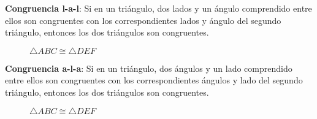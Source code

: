\begin{postulate}{\textbf{Congruencia l-a-l}:}
    Si en un triángulo, dos lados y un ángulo comprendido entre ellos son congruentes con los correspondientes lados y ángulo del segundo triángulo, entonces los dos triángulos son congruentes.

    \begin{figure}[h!]

        \centering

        \begin{subfigure}[b]{.5\textwidth}
            \centering
            
            \label{fig:congruence-sas1}
        \end{subfigure}%
        \begin{subfigure}[b]{.5\textwidth}
            \centering
            
            \label{fig:congruence-sas2}
        \end{subfigure}

        \centering
        \caption{$\triangle{ABC} \cong \triangle{DEF}$}
        \label{fig:congruencia-sas}
        
    \end{figure}    

\end{postulate}

\clearpage

\begin{postulate}{\textbf{Congruencia a-l-a}:}
    Si en un triángulo, dos ángulos y un lado comprendido entre ellos son congruentes con los correspondientes ángulos y lado del segundo triángulo, entonces los dos triángulos son congruentes.

    \begin{figure}[h!]

        \centering

        \begin{subfigure}[b]{.5\textwidth}
            \centering
            
            \label{fig:congruence-asa1}
        \end{subfigure}%
        \begin{subfigure}[b]{.5\textwidth}
            \centering
            
            \label{fig:congruence-asa2}
        \end{subfigure}

        \centering
        \caption{$\triangle{ABC} \cong \triangle{DEF}$}
        \label{fig:congruencia-asa}
        
    \end{figure}    
    
\end{postulate}

